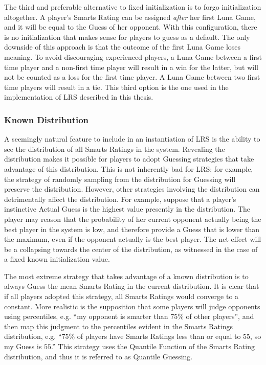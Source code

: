 The third and preferable alternative to fixed initialization is to forgo initialization altogether. A player's Smarts Rating can be assigned \textit{after} her first Luna Game, and it will be equal to the Guess of her opponent. With this configuration, there is no initialization that makes sense for players to guess as a default. The only downside of this approach is that the outcome of the first Luna Game loses meaning. To avoid discouraging experienced players, a Luna Game between a first time player and a non-first time player will result in a win for the latter, but will not be counted as a loss for the first time player. A Luna Game between two first time players will result in a tie. This third option is the one used in the implementation of LRS described in this thesis.

\subsubsection{Known Distribution}

A seemingly natural feature to include in an instantiation of LRS is the ability to see the distribution of all Smarts Ratings in the system. Revealing the distribution makes it possible for players to adopt Guessing strategies that take advantage of this distribution. This is not inherently bad for LRS; for example, the strategy of randomly sampling from the distribution for Guessing will preserve the distribution. However, other strategies involving the distribution can detrimentally affect the distribution. For example, suppose that a player's instinctive Actual Guess is the highest value presently in the distribution. The player may reason that the probability of her current opponent actually being the best player in the system is low, and therefore provide a Guess that is lower than the maximum, even if the opponent actually is the best player. The net effect will be a collapsing towards the center of the distribution, as witnessed in the case of a fixed known initialization value.

The most extreme strategy that takes advantage of a known distribution is to always Guess the mean Smarts Rating in the current distribution. It is clear that if all players adopted this strategy, all Smarts Ratings would converge to a constant. More realistic is the supposition that some players will judge opponents using percentiles, e.g. ``my opponent is smarter than $75$\% of other players'', and then map this judgment to the percentiles evident in the Smarts Ratings distribution, e.g. ``$75$\% of players have Smarts Ratings less than or equal to $55$, so my Guess is $55$.'' This strategy uses the Quantile Function of the Smarts Rating distribution, and thus it is referred to as Quantile Guessing.

